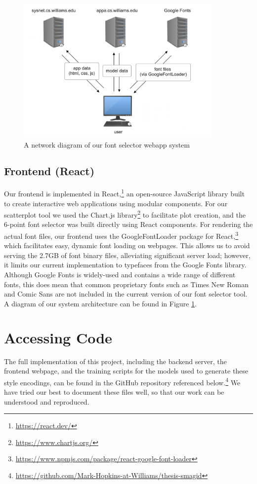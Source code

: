 \begin{figure}[]
    \centering
    \includegraphics[width=0.9\textwidth]{images/system-diagram.png}
    \caption{A network diagram of our font selector webapp system}
    \label{fig:system-diagram}
\end{figure}

\subsection{Frontend (React)} \label{frontend}

Our frontend is implemented in React,\footnote{\url{https://react.dev/}} an open-source JavaScript library built to create interactive web applications using modular components. For our scatterplot tool we used the Chart.js library\footnote{\url{https://www.chartjs.org/}} to facilitate plot creation, and the 6-point font selector was built directly using React components. For rendering the actual font files, our frontend uses the GoogleFontLoader package for React,\footnote{\url{https://www.npmjs.com/package/react-google-font-loader}} which facilitates easy, dynamic font loading on webpages. This allows us to avoid serving the 2.7GB of font binary files, alleviating significant server load; however, it limits our current implementation to typefaces from the Google Fonts library. Although Google Fonts is widely-used and contains a wide range of different fonts, this does mean that common proprietary fonts such as Times New Roman and Comic Sans are not included in the current version of our font selector tool. A diagram of our system architecture can be found in Figure \ref{fig:system-diagram}.

\section{Accessing Code}

The full implementation of this project, including the backend server, the frontend webpage, and the training scripts for the models used to generate these style encodings, can be found in the GitHub repository referenced below.\footnote{\url{https://github.com/Mark-Hopkins-at-Williams/thesis-smagid}} We have tried our best to document these files well, so that our work can be understood and reproduced.